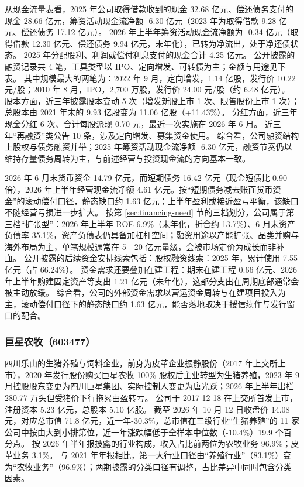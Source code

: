  从现金流量表看，2025 年公司取得借款收到的现金 32.68 亿元、偿还债务支付的现金 28.66 亿元，筹资活动现金流净额 -6.30 亿元（2023 年为取得借款 9.28 亿元、偿还债务 17.12 亿元）。 2026 年上半年筹资活动现金流净额为 -0.34 亿元（取得借款 12.30 亿元、偿还债务 9.94 亿元，未年化），已转为净流出，处于净还债状态。 2025 年分配股利、利润或偿付利息支付的现金合计 4.25 亿元。 公开披露的融资记录共 4 笔，工具类型以 IPO、定向增发、可转债为主；金额与用途见下表。 其中规模最大的两笔为：2022 年 9 月，定向增发，1.14 亿股，发行价 10.22 元/股；2010 年 8 月，IPO，2,700 万股，发行价 24.00 元/股（约 6.48 亿元）。 股本方面，近三年披露股本变动 5 次（增发新股上市 1 次、限售股份上市 1 次）；总股本由 2021 年末的 9.93 亿股变为 11.06 亿股（+11.43\%）。 分红方面，近三年现金分红 6 次、合计每股派现 0.70 元，最近一次实施在 2026 年 6 月。 近三年“再融资”类公告 10 条，涉及定向增发、募集资金使用。 综合看，公司融资结构上股权与债务融资并举；2025 年筹资活动现金流净额 -6.30 亿元，融资节奏仍以维持存量债务周转为主，与前述经营与投资现金流的方向基本一致。

 2026 年 6 月末货币资金 14.79 亿元，而短期债务 16.42 亿元（现金短债比 0.90 倍），2026 年上半年经营现金流净额 4.61 亿元。按“短期债务减去账面货币资金”的滚动偿付口径，静态缺口约 1.63 亿元；上半年盈利或接近盈亏平衡，该缺口不随经营亏损进一步扩大。 按第 \ref{sec:financing-need} 节的三档划分，公司属于第三档“扩张型”：2026 年上半年 ROE 6.9\%（未年化，折合约 13.7\%）、6 月末资产负债率 35.1\%，资产负债表仍具备加杠杆空间；融资用途以产能扩张、品类并购与海外布局为主，单笔规模通常在 5---20 亿元量级，会被市场定价为成长而非补血。 公开披露的后续资金安排线索包括：股权融资线索：2025 年，累计使用 7.55 亿元（占 66.24\%）。 资金需求还要叠加在建工程：期末在建工程 0.66 亿元、2026 年上半年购建固定资产等支出 1.21 亿元（未年化），这部分支出在周期底部通常会被主动放缓。 综合看，公司的外部资金需求以营运资金周转与在建项目投入为主，滚动偿付口径下的静态缺口约 1.63 亿元，能否落地取决于授信续作与发行窗口的配合。




\subsubsection{巨星农牧（603477）}
\label{co:603477}

 四川乐山的生猪养殖与饲料企业，前身为皮革企业振静股份（2017 年上交所上市），2020 年发行股份购买巨星农牧 100\% 股权后主业转型为生猪养殖，2023 年 9 月控股股东变更为四川巨星集团、实际控制人变更为唐光跃；2026 年上半年出栏 280.77 万头但受猪价下行拖累由盈转亏。 公司于 2017-12-18 在上交所首发上市，注册资本 5.23 亿元，总股本 5.10 亿股。 截至 2026 年 10 月 12 日收盘价 14.08 元，对应总市值 71.8 亿元，近一年-30.3\%，总市值在三级行业“生猪养殖”的 11 家公司中按由大到小排第位，近一年涨跌幅低于全样本中位数（-10.4\%）19.9 个百分点。 按 2026 年半年报披露的行业构成，收入占比前两位为农牧业务 96.9\%；皮革业务 3.1\%。 与 2021 年年报相比，第一大行业口径由“养殖行业”（83.1\%）变为“农牧业务”（96.9\%）；两期披露的分类口径有调整，占比差异中同时包含分类因素。

